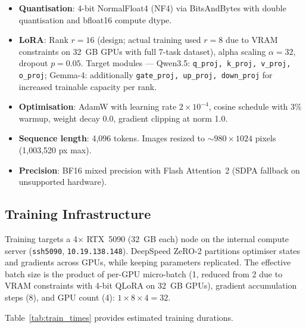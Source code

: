 \documentclass[11pt,a4paper]{article}
\begin{document}
\begin{itemize}[leftmargin=*,itemsep=2pt]
  \item \textbf{Quantisation}: 4-bit NormalFloat4 (NF4) via BitsAndBytes with double quantisation and bfloat16 compute dtype.
  \item \textbf{LoRA}: Rank $r = 16$ (design; actual training used $r = 8$ due to VRAM constraints on 32~GB GPUs with full 7-task dataset), alpha scaling $\alpha = 32$, dropout $p = 0.05$. Target modules — Qwen3.5: \texttt{q\_proj, k\_proj, v\_proj, o\_proj}; Gemma-4: additionally \texttt{gate\_proj, up\_proj, down\_proj} for increased trainable capacity per rank.
  \item \textbf{Optimisation}: AdamW with learning rate $2 \times 10^{-4}$, cosine schedule with 3\% warmup, weight decay 0.0, gradient clipping at norm 1.0.
  \item \textbf{Sequence length}: 4,096 tokens. Images resized to $\sim 980 \times 1024$ pixels (1,003,520 px max).
  \item \textbf{Precision}: BF16 mixed precision with Flash Attention~2 (SDPA fallback on unsupported hardware).
\end{itemize}

\subsection{Training Infrastructure}

Training targets a 4$\times$ RTX~5090 (32~GB each) node on the internal compute server (\texttt{ssh5090}, \texttt{10.19.138.148}). DeepSpeed ZeRO-2 partitions optimiser states and gradients across GPUs, while keeping parameters replicated. The effective batch size is the product of per-GPU micro-batch (1, reduced from 2 due to VRAM constraints with 4-bit QLoRA on 32~GB GPUs), gradient accumulation steps (8), and GPU count (4): $1 \times 8 \times 4 = 32$.

Table~\ref{tab:train_times} provides estimated training durations.
\end{document}

